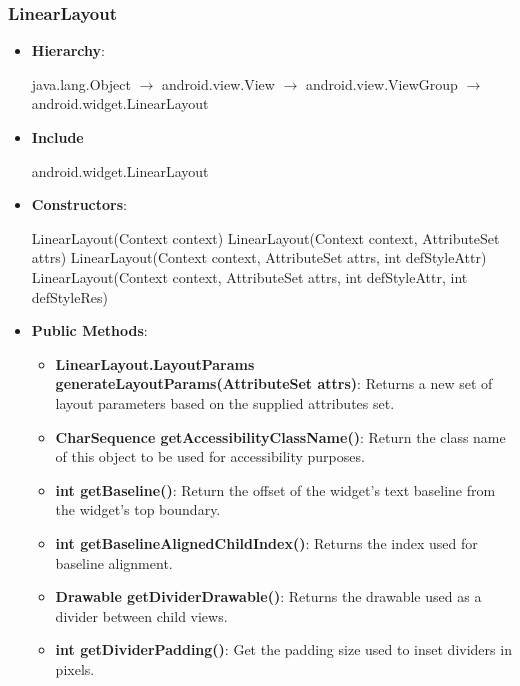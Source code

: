 \documentclass{report}
\begin{document}
    \pagebreak 
    \subsubsection{LinearLayout}
    \begin{itemize}
        \item \textbf{Hierarchy}:
            \begin{center}
                java.lang.Object $\to$	android.view.View $\to $	android.view.ViewGroup $\to $	android.widget.LinearLayout
            \end{center}
        \item \textbf{Include}
            \bigbreak \noindent 
            \begin{javacode}
            android.widget.LinearLayout
            \end{javacode}
        \item \textbf{Constructors}:
            \bigbreak \noindent 
            \begin{javacode}
                LinearLayout(Context context)
                LinearLayout(Context context, AttributeSet attrs)
                LinearLayout(Context context, AttributeSet attrs, int defStyleAttr)
                LinearLayout(Context context, AttributeSet attrs, int defStyleAttr, int defStyleRes) 
            \end{javacode}
        \item \textbf{Public Methods}:
            \begin{itemize}
                \item \textbf{LinearLayout.LayoutParams generateLayoutParams(AttributeSet attrs)}: Returns a new set of layout parameters based on the supplied attributes set.
                \item \textbf{CharSequence getAccessibilityClassName()}: Return the class name of this object to be used for accessibility purposes.
                \item \textbf{int getBaseline()}: Return the offset of the widget's text baseline from the widget's top boundary.
                \item \textbf{int getBaselineAlignedChildIndex()}: Returns the index used for baseline alignment.
                \item \textbf{Drawable getDividerDrawable()}: Returns the drawable used as a divider between child views.
                \item \textbf{int getDividerPadding()}: Get the padding size used to inset dividers in pixels.

\end{itemize}
\end{itemize}
\end{document}
